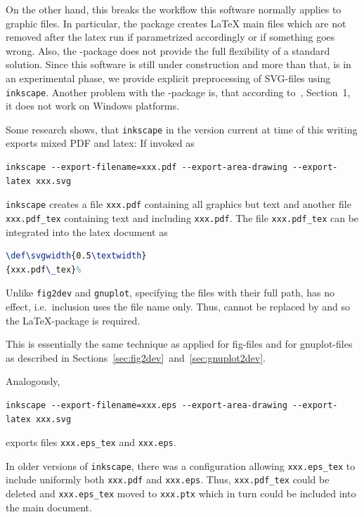 On the other hand, 
this breaks the workflow this software normally applies to graphic files. 
In particular, the package creates \LaTeX{} main files 
which are not removed after the latex run 
if parametrized accordingly or if something goes wrong. 
Also, the -package does not provide the full flexibility 
of a standard solution. 
Since this software is still under construction 
and more than that, is in an experimental phase, 
we provide explicit preprocessing of SVG-files using \texttt{inkscape}. 
Another problem with the -package is, 
that according to~\cite{SvgP}, Section~1, 
it does not work on Windows platforms. 


Some research shows,
that \texttt{inkscape} in the version current at time of this writing
exports mixed PDF and latex: If invoked as 
%
\begin{Verbatim}[fontsize=\footnotesize]
inkscape --export-filename=xxx.pdf --export-area-drawing --export-latex xxx.svg 
\end{Verbatim}
%
\texttt{inkscape} creates a file \texttt{xxx.pdf}
containing all graphics but text and another file \texttt{xxx.pdf\_tex}
containing text and including \texttt{xxx.pdf}.
The file \texttt{xxx.pdf\_tex}
can be integrated into the latex document as
%
\begin{lstlisting}[language=TeX]
\def\svgwidth{0.5\textwidth}
{xxx.pdf\_tex}%
\end{lstlisting}
%
Unlike \texttt{fig2dev} and \texttt{gnuplot}, 
specifying the files with their full path, 
has no effect, i.e.~inclusion uses the file name only. 
Thus,  cannot be replaced by  
and so the \LaTeX-package  is required. 
 

This is essentially the same technique as applied for fig-files 
and for gnuplot-files as described 
in Sections~\ref{sec:fig2dev}~and~\ref{sec:gnuplot2dev}. 

Analogously,
%
\begin{Verbatim}[fontsize=\footnotesize]
inkscape --export-filename=xxx.eps --export-area-drawing --export-latex xxx.svg 
\end{Verbatim}
%
exports files \texttt{xxx.eps\_tex} and \texttt{xxx.eps}.

In older versions of \texttt{inkscape},
there was a configuration allowing \texttt{xxx.eps\_tex}
to include uniformly both \texttt{xxx.pdf} and \texttt{xxx.eps}.
Thus, \texttt{xxx.pdf\_tex} could be deleted
and \texttt{xxx.eps\_tex} moved to \texttt{xxx.ptx}
which in turn could be included into the main document.

